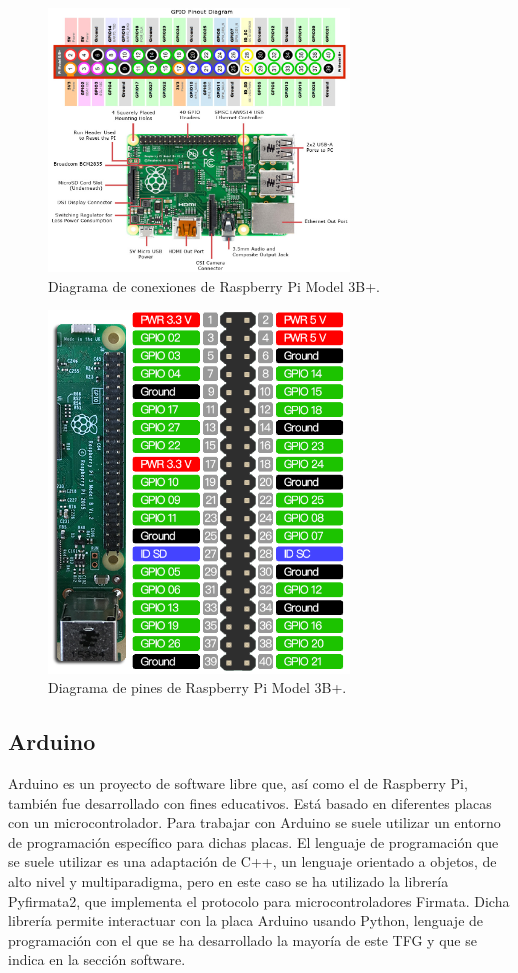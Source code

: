 \documentclass[a4paper, 12pt, oneside]{book}
\begin{document}
\begin{figure}[H]
	\centering
    \includegraphics[width=8cm, keepaspectratio]{img/conexiones_raspberry}
    \caption{Diagrama de conexiones de Raspberry Pi Model 3B+.}
    \label{figura:conexiones_raspberry}
\end{figure}


\begin{figure}[H]
	\centering
    \includegraphics[width=8cm, keepaspectratio]{img/pines_raspberry}
    \caption{Diagrama de pines de Raspberry Pi Model 3B+.}
    \label{figura:pines_raspberry}
\end{figure}

\subsection{Arduino}
\label{subsec:arduino}

Arduino es un proyecto de software libre que, así como el de Raspberry Pi, también fue desarrollado con fines educativos. Está basado en diferentes placas con un microcontrolador. Para trabajar con Arduino se suele utilizar un entorno de programación específico para dichas placas. El lenguaje de programación que se suele utilizar es una adaptación de C++, un lenguaje orientado a objetos, de alto nivel y multiparadigma, pero en este caso se ha utilizado la librería Pyfirmata2, que implementa el protocolo para microcontroladores Firmata. Dicha librería permite interactuar con la placa Arduino usando Python, lenguaje de programación con el que se ha desarrollado la mayoría de este TFG y que se indica en la sección software.
\end{document}
